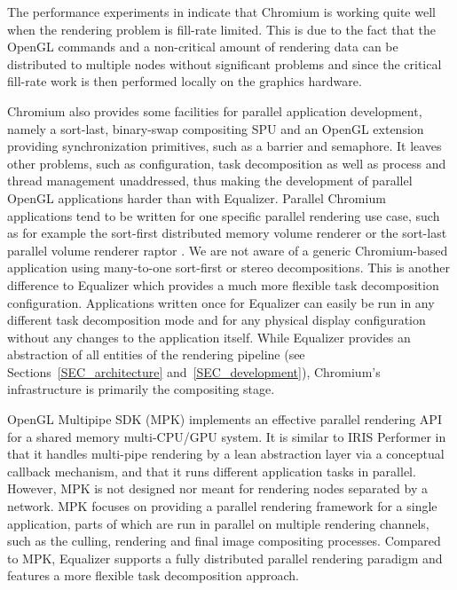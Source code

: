 \documentclass[journal]{vgtc}                %
\begin{document}
The performance experiments in \cite{HHNFAKK:02} indicate that Chromium is working
quite well when the rendering problem is fill-rate limited.
This is due to the fact that the OpenGL commands and a non-critical
amount of rendering data can be distributed to multiple nodes without significant problems
and since the critical fill-rate work is then performed locally on the graphics hardware.

Chromium also provides some facilities for parallel application
development, namely a sort-last, binary-swap compositing SPU and an
OpenGL extension providing synchronization primitives, such as a barrier
and semaphore. It leaves other problems, such as configuration, task
decomposition as well as process and thread management unaddressed, thus
making the development of parallel OpenGL applications harder than with
Equalizer. Parallel Chromium applications tend to be written for one
specific parallel rendering use case, such as for example the sort-first distributed
memory volume renderer \cite{BHPB:03} or the sort-last parallel
volume renderer raptor \cite{Raptor}. We are not aware of a generic Chromium-based
application using many-to-one sort-first or stereo decompositions. This is
another difference to Equalizer which provides a much more flexible
task decomposition configuration. Applications written once for Equalizer can
easily be run in any different task decomposition mode and for any physical
display configuration without any changes to the application itself.
While Equalizer provides an abstraction of all entities of the rendering pipeline
(see Sections~\ref{SEC_architecture} and~\ref{SEC_development}), Chromium's
infrastructure is primarily the compositing stage.

OpenGL Multipipe SDK (MPK) \cite{BRE:05} implements an effective
parallel rendering API for a shared memory multi-CPU/GPU system. It is
similar to IRIS Performer \cite{RH:94} in that it handles multi-pipe
rendering by a lean abstraction layer via a conceptual callback
mechanism, and that it runs different application tasks in
parallel. However, MPK is not designed nor meant for rendering nodes
separated by a network. MPK focuses on providing a parallel rendering
framework for a single application, parts of which are run in parallel
on multiple rendering channels, such as the culling, rendering and final
image compositing processes. Compared to MPK, Equalizer supports a
fully distributed parallel rendering paradigm and features a more flexible
task decomposition approach.


\end{document}

